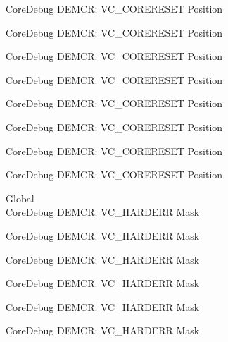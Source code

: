 \begin{DoxyRefList}
\label{deprecated__deprecated000747}%
%
Core\+Debug DEMCR\+: VC\+\_\+\+CORERESET Position 

\label{deprecated__deprecated000815}%
%
Core\+Debug DEMCR\+: VC\+\_\+\+CORERESET Position 

\label{deprecated__deprecated000891}%
%
Core\+Debug DEMCR\+: VC\+\_\+\+CORERESET Position 

\label{deprecated__deprecated000954}%
%
Core\+Debug DEMCR\+: VC\+\_\+\+CORERESET Position 

\label{deprecated__deprecated001033}%
%
Core\+Debug DEMCR\+: VC\+\_\+\+CORERESET Position 

\label{deprecated__deprecated001109}%
%
Core\+Debug DEMCR\+: VC\+\_\+\+CORERESET Position 

\label{deprecated__deprecated001198}%
%
Core\+Debug DEMCR\+: VC\+\_\+\+CORERESET Position 

\label{deprecated__deprecated001300}%
%
Core\+Debug DEMCR\+: VC\+\_\+\+CORERESET Position  
\item[Global \doxylink{group___c_m_s_i_s___core_debug_ga803fc98c5bb85f10f0347b23794847d1}{Core\+Debug\+\_\+\+DEMCR\+\_\+\+VC\+\_\+\+HARDERR\+\_\+\+Msk} ]\hfill \\
\label{deprecated__deprecated000056}%
%
Core\+Debug DEMCR\+: VC\+\_\+\+HARDERR Mask 

\label{deprecated__deprecated000136}%
%
Core\+Debug DEMCR\+: VC\+\_\+\+HARDERR Mask 

\label{deprecated__deprecated000200}%
%
Core\+Debug DEMCR\+: VC\+\_\+\+HARDERR Mask 

\label{deprecated__deprecated000275}%
%
Core\+Debug DEMCR\+: VC\+\_\+\+HARDERR Mask 

\label{deprecated__deprecated000342}%
%
Core\+Debug DEMCR\+: VC\+\_\+\+HARDERR Mask 

\label{deprecated__deprecated000418}%
%
Core\+Debug DEMCR\+: VC\+\_\+\+HARDERR Mask 


\end{DoxyRefList}
